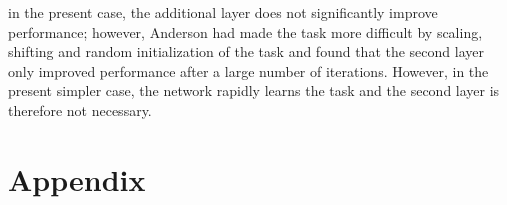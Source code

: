 \documentclass{article}
\begin{document}
in the present case, the additional layer does not significantly improve performance; however, Anderson had made the task more difficult by scaling, shifting and random initialization of the task and found that the second layer only improved performance after a large number of iterations. However, in the present simpler case, the network rapidly learns the task and the second layer is therefore not necessary.
%

\newpage

\section*{Appendix}

%
\end{document}
